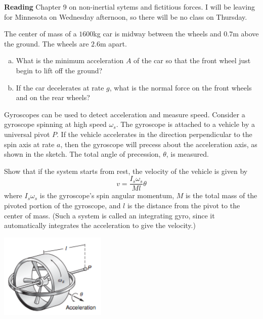 \documentclass[12pt,letterpaper]{hmcpset}
\begin{document}

\textbf{Reading} Chapter 9 on non-inertial sytems and fictitious forces. I
will be leaving for Minnesota on Wednesday afternoon, so there will be
no class on Thursday.

\begin{problem}
    The center of mass of a $1600$kg car is midway between the wheels and
    $0.7$m above the ground. The wheels are $2.6$m apart.
    \begin{enumerate}[a)]
        \item What is the minimum acceleration $A$ of the car so that the front
            wheel just begin to lift off the ground?
        \item If the car decelerates at rate $g$, what is the normal force on the
            front wheels and on the rear wheels?
    \end{enumerate}
\end{problem}
\begin{solution}
    \vfill
\end{solution}
\clearpage

\begin{problem}
    Gyroscopes can be used to detect acceleration and measure speed. Consider a
    gyroscope spinning at high speed $\omega_{s}$. The gyroscope is attached to a
    vehicle by a universal pivot $P$. If the vehicle accelerates in the direction
    perpendicular to the spin axis at rate $a$, then the gyroscope will precess
    about the acceleration axis, as shown in the sketch. The total angle of
    precession, $\theta$, is measured.

    Show that if the system starts from rest, the velocity of the vehicle is given
    by 
    \begin{equation*}
        v = \frac{I_{s} \omega_{s}}{M l} \theta
    \end{equation*}
    where $I_{s}\omega_{s}$ is the gyroscope's spin angular momentum, $M$ is the
    total mass of the pivoted portion of the gyroscope, and $l$ is the distance from
    the pivot to the center of mass. (Such a system is called an integrating gyro,
    since it automatically integrates the acceleration to give the velocity.)

    \begin{center}
        \includegraphics[width=2in]{img/9_5}
    \end{center}
\end{problem}
\begin{solution}
    \vfill
\end{solution}
\clearpage
\end{document}
